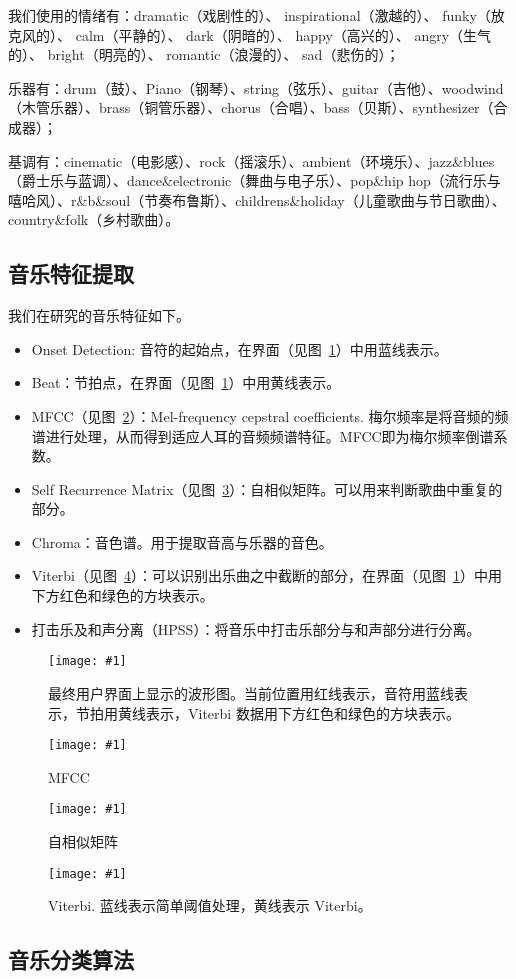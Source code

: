 \documentclass[a4paper,utf8,10pt]{article}
\newcommand{\sept}{\setlength\itemsep{-4pt}}
\newcommand{\somefigure}[4]{
  \begin{figure}[#4]
    \begin{center}
      \vspace{-13pt}
      \texttt{[image: \#1]}
      \vspace{-10pt}
      \caption{#2}
      \label{#3}
      \vspace{-10pt}
    \end{center}
  \end{figure}
}
\begin{document}
我们使用的情绪有：dramatic（戏剧性的）、 inspirational（激越的）、 funky（放克风的）、 calm（平静的）、 dark（阴暗的）、 happy（高兴的）、 angry（生气的）、 bright（明亮的）、 romantic（浪漫的）、 sad（悲伤的）；

乐器有：drum（鼓）、Piano（钢琴）、string（弦乐）、guitar（吉他）、woodwind（木管乐器）、brass（铜管乐器）、chorus（合唱）、bass（贝斯）、synthesizer（合成器）；

基调有：cinematic（电影感）、rock（摇滚乐）、ambient（环境乐）、jazz\&blues（爵士乐与蓝调）、dance\&electronic（舞曲与电子乐）、pop\&hip hop（流行乐与嘻哈风）、r\&b\&soul（节奏布鲁斯）、childrens\&holiday（儿童歌曲与节日歌曲）、country\&folk（乡村歌曲）。

\subsection{音乐特征提取}

我们在研究的音乐特征如下。
\begin{itemize}
  \sept
  \item Onset Detection: 音符的起始点，在界面（见图~\ref{fig:wave}）中用蓝线表示。
  \item Beat：节拍点，在界面（见图~\ref{fig:wave}）中用黄线表示。
  \item MFCC（见图~\ref{fig:mfcc}）：Mel-frequency cepstral coefficients. 梅尔频率是将音频的频谱进行处理，从而得到适应人耳的音频频谱特征。MFCC即为梅尔频率倒谱系数。
  \item Self Recurrence Matrix（见图~\ref{fig:selfrec}）：自相似矩阵。可以用来判断歌曲中重复的部分。
  \item Chroma：音色谱。用于提取音高与乐器的音色。
  \item Viterbi（见图~\ref{fig:viterbi}）：可以识别出乐曲之中截断的部分，在界面（见图~\ref{fig:wave}）中用下方红色和绿色的方块表示。
  \item 打击乐及和声分离（HPSS）：将音乐中打击乐部分与和声部分进行分离。
\end{itemize}

\somefigure{images/wave.1522x434.jpg}{最终用户界面上显示的波形图。当前位置用红线表示，音符用蓝线表示，节拍用黄线表示，Viterbi 数据用下方红色和绿色的方块表示。}{fig:wave}{p}
\somefigure{images/mfcc.937x400.jpg}{MFCC}{fig:mfcc}{p}
\somefigure{images/recurrence.800x400.jpg}{自相似矩阵}{fig:selfrec}{p}
\somefigure{images/viterbi.1045x308.jpg}{Viterbi. 蓝线表示简单阈值处理，黄线表示 Viterbi。}{fig:viterbi}{p}

\subsection{音乐分类算法}
\end{document}

